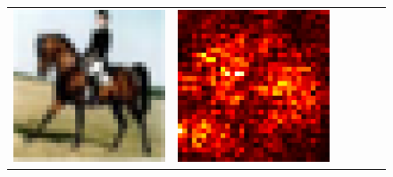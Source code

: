 \documentclass[preprint,12pt]{elsarticle}
\begin{document}
\begin{figure}[p]
\begin{tabular}{cccccc}
  \includegraphics[scale=\scale]{../visualizations/examples/cifar10/cnn/images/7.png} &
  \includegraphics[scale=\scale]{../visualizations/examples/cifar10/cnn/saliency_map/7.png} & 

\end{tabular}
\end{figure}
\end{document}
